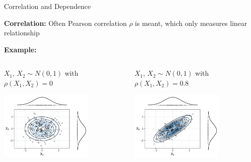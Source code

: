 \documentclass[11pt,compress,t,notes=noshow, aspectratio=169, xcolor=table]{beamer}
\begin{document}
\begin{frame}{Correlation and Dependence}

\textbf{Correlation:} Often Pearson correlation $\rho$ is meant, which only measures linear relationship %

\textbf{Example:} 

\begin{columns}[totalwidth=\textwidth]
\begin{column}{0.5\linewidth}
\centering
$X_1$, $X_2 \sim N(0,1)$ with $\rho(X_1, X_2) = 0$

\includegraphics[width = 0.7\textwidth]{figure/independent}
\end{column}
\begin{column}{0.5\linewidth}
\centering
$X_1$, $X_2 \sim N(0,1)$ with $\rho(X_1, X_2) = 0.8$

\includegraphics[width = 0.7\textwidth]{figure/dependent}
\end{column}
\end{columns}



\end{frame}
\end{document}
